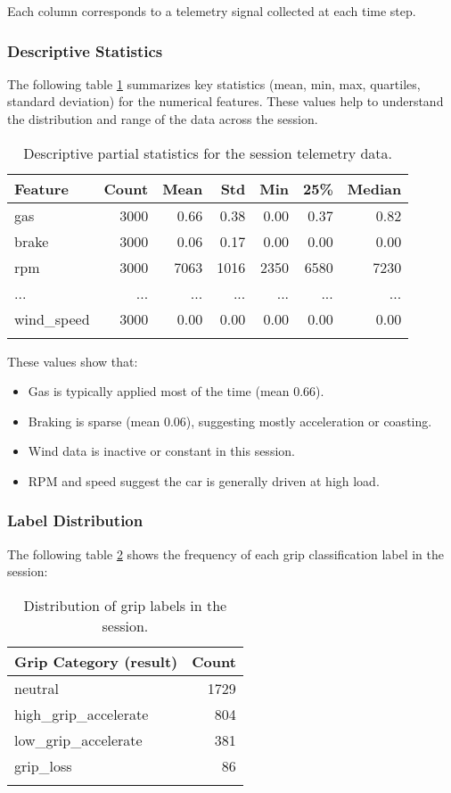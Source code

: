 \documentclass[a4paper,final,12pt]{report}
\begin{document}
Each column corresponds to a telemetry signal collected at each time step. 

\subsubsection{Descriptive Statistics}
The following table \ref{tab:stat_tab} summarizes key statistics (mean, min, max, quartiles, standard deviation) for the numerical features. These values help to understand the distribution and range of the data across the session.

\begin{longtable}{|l|r|r|r|r|r|r|}
\hline
\textbf{Feature} & \textbf{Count} & \textbf{Mean} & \textbf{Std} & \textbf{Min} & \textbf{25\%} & \textbf{Median} \\
\hline
gas & 3000 & 0.66 & 0.38 & 0.00 & 0.37 & 0.82 \\
brake & 3000 & 0.06 & 0.17 & 0.00 & 0.00 & 0.00 \\
rpm & 3000 & 7063 & 1016 & 2350 & 6580 & 7230 \\
... & ... & ... & ... & ... & ... & ... \\
wind\_speed & 3000 & 0.00 & 0.00 & 0.00 & 0.00 & 0.00 \\
\hline
\caption{Descriptive partial statistics for the session telemetry data.}
\label{tab:stat_tab}
\end{longtable}

These values show that:
\begin{itemize}
    \item Gas is typically applied most of the time (mean 0.66).
    \item Braking is sparse (mean 0.06), suggesting mostly acceleration or coasting.
    \item Wind data is inactive or constant in this session.
    \item RPM and speed suggest the car is generally driven at high load.
\end{itemize}

\subsubsection{Label Distribution}
The following table \ref{tab:lab_distr} shows the frequency of each grip classification label in the session:

\begin{longtable}{|l|r|}
\hline
\textbf{Grip Category (result)} & \textbf{Count} \\
\hline
neutral & 1729 \\
high\_grip\_accelerate & 804 \\
low\_grip\_accelerate & 381 \\
grip\_loss & 86 \\
\hline
\caption{Distribution of grip labels in the session.}
\label{tab:lab_distr}
\end{longtable}
\end{document}
